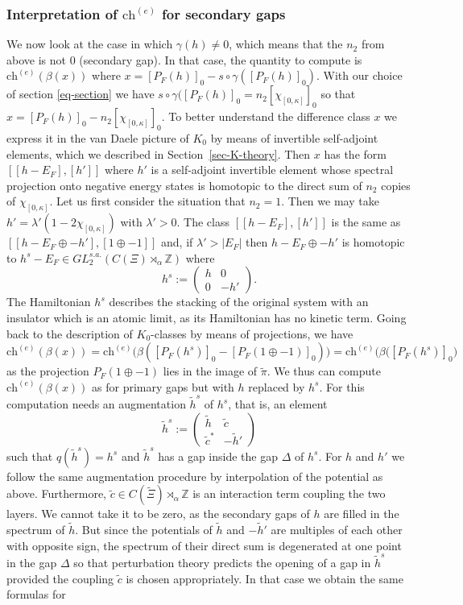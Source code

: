 \documentclass[11pt]{amsart}
\newcommand{\Z}{\mathbb{Z}}
\newcommand{\cut}{\kappa}
\newcommand{\che}{\text{ch}^{(e)}}
\begin{document}
\subsubsection{Interpretation of $\che$ for secondary gaps}\label{sec-secondary-gaps}
We now look at the case in which $\gamma(h)\neq 0$, which means that the $n_2$ from above is not $0$ (secondary gap). In that case, the quantity to compute is $\che(\beta(x))$ where $x=[P_F(h)]_0-s\circ\gamma([P_F(h)]_0)$.   
With our choice of section \eqref{eq-section} we have $s\circ\gamma([P_F(h)]_0 = n_2[\chi_{[0,\cut]}]_0$ so that $x=[P_F(h)]_0 - n_2[\chi_{[0,\cut]}]_0$. To better understand the difference class $x$ we express it in the van Daele picture of $K_0$ by means of invertible self-adjoint elements, which we described in Section~\ref{sec-K-theory}. Then $x$ has the form $[[h-E_F],[h']]$ where $h'$ is a self-adjoint invertible element whose spectral projection onto negative energy states is homotopic to the direct sum of $n_2$ copies of $\chi_{[0,\cut]}$. Let us first consider the situation that $n_2=1$. Then we may take $h' = \lambda'(1-2\chi_{[0,\cut]})$ with $\lambda'>0$. The class $[[h-E_F],[h']]$ is the same as $[[h-E_F\oplus -h'],[1\oplus -1]]$ and, if $\lambda'>|E_F|$ then $h-E_F\oplus -h'$ is homotopic to  $h^s-E_F\in GL^{s.a.}_2(C(\Xi)\rtimes_\alpha\Z)$ where
$$h^s:=\begin{pmatrix}
	h & 0 \\ 0 & -h' 
\end{pmatrix}.$$
The Hamiltonian $h^s$ describes the stacking of the original system with an insulator which is an atomic limit, as its Hamiltonian has no kinetic term.
Going back to the description of $K_0$-classes by means of projections, we have
$$\che(\beta(x)) = \che\big(\beta([P_F(h^s)]_0- [P_F(1\oplus -1)]_0)\big)= \che\big(\beta([P_F(h^s)]_0\big)$$
as the projection $P_F(1\oplus -1)$ lies in the image of $\tilde\pi$. We thus can compute  
$\che(\beta(x))$ as for primary gaps but with $h$ replaced by $h^s$. 
For this computation needs an augmentation $\tilde h^s$ of $h^s$, that is, an element 
$$\tilde h^s:=\begin{pmatrix}
	\tilde h & \tilde c \\ \tilde c^* & -\tilde h' %
\end{pmatrix}$$
such that $q(\tilde h^s) = h^s$ and $\tilde h^s$ has a gap inside the gap $\Delta$ of $h^s$. For $h$ and $h'$ we follow the same augmentation procedure by interpolation of the potential as above. Furthermore, 
$\tilde c\in C(\tilde \Xi)\rtimes_\alpha\Z$ is an interaction term coupling the two layers. We cannot take it to be zero, as the secondary gaps of $h$ are filled in the spectrum of $\tilde h$. But since the potentials of $\tilde h$ and $-\tilde h'$ are multiples of each other with opposite sign, the spectrum of their direct sum is degenerated at one point in the gap $\Delta$ so that perturbation theory predicts the opening of a gap in $\tilde h^s$ provided the coupling $\tilde c$ is chosen appropriately. In that case we obtain the same formulas for 
\end{document}
